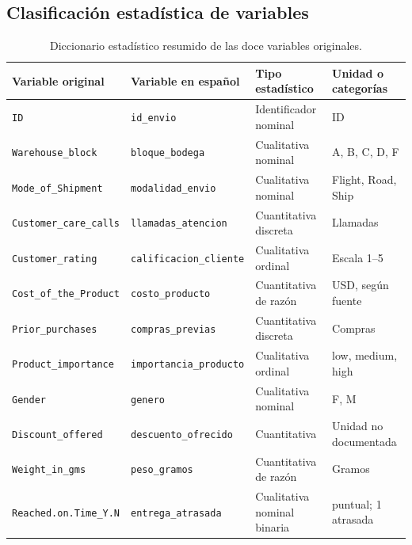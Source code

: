 \documentclass[11pt,a4paper]{article}
\begin{document}
\subsection{Clasificación estadística de variables}

\begin{table}[H]
\centering
\footnotesize
\caption{Diccionario estadístico resumido de las doce variables originales.}
\label{tab:diccionario}
\setlength{\tabcolsep}{4pt}
\renewcommand{\arraystretch}{1.25}

\begin{tabularx}{\linewidth}{@{}>{\raggedright\arraybackslash}X
                             >{\raggedright\arraybackslash}X
                             >{\raggedright\arraybackslash}X
                             >{\raggedright\arraybackslash}X@{}}
\toprule
\textbf{Variable original} &
\textbf{Variable en español} &
\textbf{Tipo estadístico} &
\textbf{Unidad o categorías} \\
\midrule

\texttt{ID} &
\texttt{id\_envio} &
Identificador nominal &
ID \\

\texttt{Warehouse\_block} &
\texttt{bloque\_bodega} &
Cualitativa nominal &
A, B, C, D, F \\

\texttt{Mode\_of\_Shipment} &
\texttt{modalidad\_envio} &
Cualitativa nominal &
Flight, Road, Ship \\

\texttt{Customer\_care\_calls} &
\texttt{llamadas\_atencion} &
Cuantitativa discreta &
Llamadas \\

\texttt{Customer\_rating} &
\texttt{calificacion\_cliente} &
Cualitativa ordinal &
Escala 1--5 \\

\texttt{Cost\_of\_the\_Product} &
\texttt{costo\_producto} &
Cuantitativa de razón &
USD, según fuente \\

\texttt{Prior\_purchases} &
\texttt{compras\_previas} &
Cuantitativa discreta &
Compras \\

\texttt{Product\_importance} &
\texttt{importancia\_producto} &
Cualitativa ordinal &
low, medium, high \\

\texttt{Gender} &
\texttt{genero} &
Cualitativa nominal &
F, M \\

\texttt{Discount\_offered} &
\texttt{descuento\_ofrecido} &
Cuantitativa &
Unidad no documentada \\

\texttt{Weight\_in\_gms} &
\texttt{peso\_gramos} &
Cuantitativa de razón &
Gramos \\

\texttt{Reached.on.Time\_Y.N} &
\texttt{entrega\_atrasada} &
Cualitativa nominal binaria &
0 puntual; 1 atrasada \\

\bottomrule
\end{tabularx}
\end{table}
\end{document}
